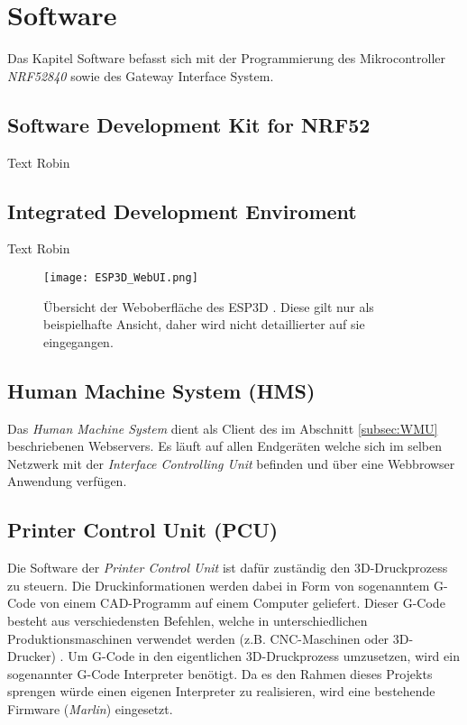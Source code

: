 \clearpage
\section{Software}\label{sec:Software}
Das Kapitel Software befasst sich mit der Programmierung des Mikrocontroller \textit{NRF52840} sowie des Gateway Interface System.

\subsection{Software Development Kit for NRF52}\label{subsec:SDK}
Text Robin

\subsection{Integrated Development Enviroment}\label{subsec:IDE}
Text Robin

\begin{figure}[h]
	\centering
	\texttt{[image: ESP3D\_WebUI.png]}
	\caption{Übersicht der Weboberfläche des ESP3D \cite{ESP3D_Web_UI}. Diese gilt nur als beispielhafte Ansicht, daher wird nicht detaillierter auf sie eingegangen.}
	\label{img:Weboberflaeche_ESP3D_Uebersicht}
\end{figure} 



\subsection{Human Machine System (HMS)}\label{subsec:HMS_SW}
Das \textit{Human Machine System} dient als Client des im Abschnitt \ref{subsec:WMU} beschriebenen Webservers. Es läuft auf allen Endgeräten welche sich im selben Netzwerk mit der \textit{Interface Controlling Unit} befinden und über eine Webbrowser Anwendung verfügen. 









\subsection{Printer Control Unit (PCU)}\label{subsec:PCU}
Die Software der \textit{Printer Control Unit} ist dafür zuständig den 3D-Druckprozess zu steuern. Die Druckinformationen werden dabei in Form von sogenanntem G-Code von einem CAD-Programm auf einem Computer geliefert. Dieser G-Code besteht aus verschiedensten Befehlen, welche in unterschiedlichen Produktionsmaschinen verwendet werden (z.B. CNC-Maschinen oder 3D-Drucker) \cite{G_Code_Tutorial}. Um G-Code in den eigentlichen 3D-Druckprozess umzusetzen, wird ein sogenannter G-Code Interpreter benötigt. Da es den Rahmen dieses Projekts sprengen würde einen eigenen Interpreter zu realisieren, wird eine bestehende Firmware (\textit{Marlin}) eingesetzt. 

